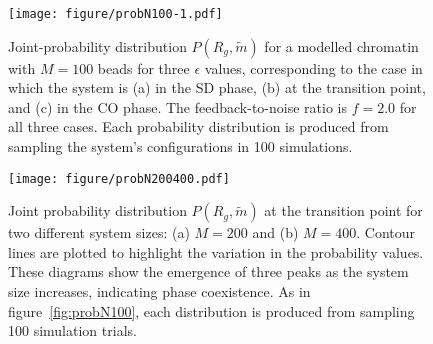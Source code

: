 \documentclass[12pt]{article}
\newcommand*{\DataFig}{/Users/MichaelChiang/Desktop/epigenetics_data/}
\begin{document}
\begin{figure}[H]
\centering
\centerline{\texttt{[image: figure/probN100-1.pdf]}}
\caption{Joint-probability distribution $P(R_g,\widetilde{m})$ for a modelled chromatin with $M = 100$ beads for three $\epsilon$ values, corresponding to the case in which the system is (a) in the SD phase, (b) at the transition point, and (c) in the CO phase. The feedback-to-noise ratio is $f = 2.0$ for all three cases. Each probability distribution is produced from sampling the system's configurations in 100 simulations.}
\label{fig:probN100}
\vspace{20pt}
\centering
\texttt{[image: figure/probN200400.pdf]}
\caption{Joint probability distribution $P(R_g,\widetilde{m})$ at the transition point for two different system sizes: (a) $M = 200$ and (b) $M = 400$. Contour lines are plotted to highlight the variation in the probability values. These diagrams show the emergence of three peaks as the system size increases, indicating phase coexistence. As in figure~\ref{fig:probN100}, each distribution is produced from sampling 100 simulation trials.}
\label{fig:probN200400}
\end{figure}
\end{document}
